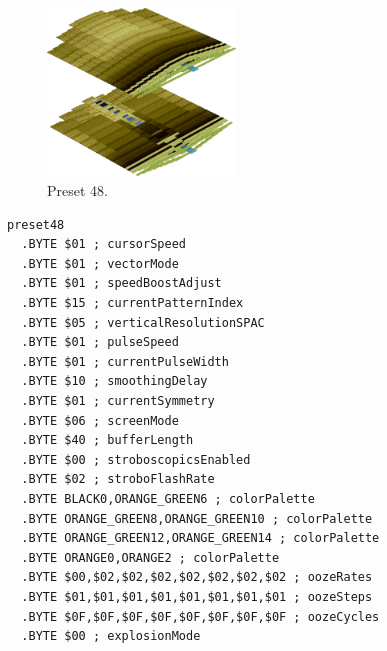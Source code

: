 \clearpage
\begin{minipage}[b]{0.48\linewidth}
\begin{figure}[H]                                                          
  \centering                                                             
  \begin{adjustbox}{width=5cm,center}                                   
  \includegraphics[width=5cm]{src/colorspace_presets/preset48-45.png}%
  \end{adjustbox}                                                        
\caption*{Preset 48.}                                           
\end{figure}                                                               
\end{minipage}
\hspace{0.1cm}
\begin{minipage}[b]{0.48\linewidth}                            
\begin{lstlisting}[basicstyle=\ttfamily\tiny]
preset48
  .BYTE $01 ; cursorSpeed
  .BYTE $01 ; vectorMode
  .BYTE $01 ; speedBoostAdjust
  .BYTE $15 ; currentPatternIndex
  .BYTE $05 ; verticalResolutionSPAC
  .BYTE $01 ; pulseSpeed
  .BYTE $01 ; currentPulseWidth
  .BYTE $10 ; smoothingDelay
  .BYTE $01 ; currentSymmetry
  .BYTE $06 ; screenMode
  .BYTE $40 ; bufferLength
  .BYTE $00 ; stroboscopicsEnabled
  .BYTE $02 ; stroboFlashRate
  .BYTE BLACK0,ORANGE_GREEN6 ; colorPalette
  .BYTE ORANGE_GREEN8,ORANGE_GREEN10 ; colorPalette
  .BYTE ORANGE_GREEN12,ORANGE_GREEN14 ; colorPalette
  .BYTE ORANGE0,ORANGE2 ; colorPalette
  .BYTE $00,$02,$02,$02,$02,$02,$02,$02 ; oozeRates
  .BYTE $01,$01,$01,$01,$01,$01,$01,$01 ; oozeSteps
  .BYTE $0F,$0F,$0F,$0F,$0F,$0F,$0F,$0F ; oozeCycles
  .BYTE $00 ; explosionMode
\end{lstlisting}
\end{minipage}

\vspace*{-0.5cm}

